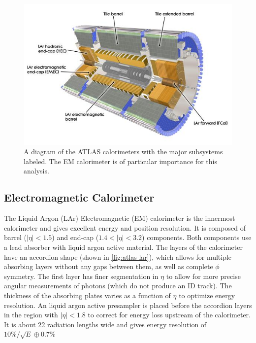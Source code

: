 \begin{figure}[htbp]
\centering
\includegraphics[width=.8\textwidth]{figures/Detector/atlas-calorimeters.jpg}
\caption{A diagram of the \ac{ATLAS} calorimeters with the major subsystems labeled. The \ac{EM} calorimeter is of particular importance for this analysis. \cite{calorimeters}}
\label{fig:atlas-calos}
\end{figure}


\subsection{Electromagnetic Calorimeter}

The Liquid Argon (LAr) Electromagnetic (EM) calorimeter is the innermost calorimeter and gives excellent energy and position resolution. \cite{calorimeters} It is composed of barrel ($|\eta| < 1.5$) and end-cap ($1.4 < |\eta| < 3.2$) components. Both components use a lead absorber with liquid argon active material. The layers of the calorimeter have an accordion shape (shown in \autoref{fig:atlas-lar}), which allows for multiple absorbing layers without any gaps between them, as well as complete $\phi$ symmetry. The first layer has finer segmentation in $\eta$ to allow for more precise angular measurements of photons (which do not produce an \ac{ID} track). The thickness of the absorbing plates varies as a function of $\eta$ to optimize energy resolution. An liquid argon active presampler is placed before the accordion layers in the region with $|\eta| < 1.8$ to correct for energy loss upstream of the calorimeter. It is about 22 radiation lengths wide and gives energy resolution of $10\%/\sqrt{E} \oplus 0.7\%$

